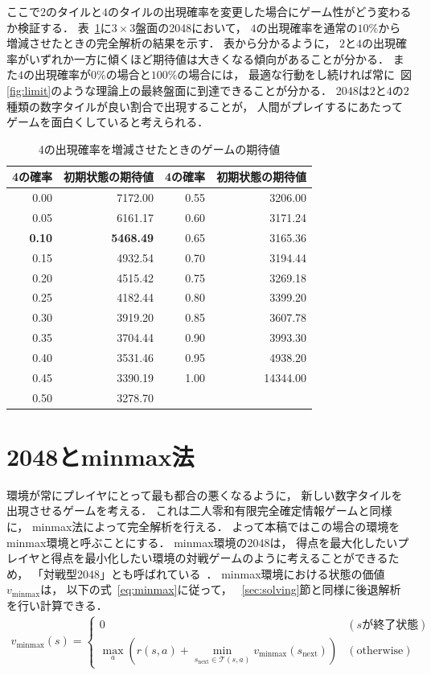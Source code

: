 ここで$2$のタイルと$4$のタイルの出現確率を変更した場合にゲーム性がどう変わるか検証する．
表~\ref{table: value_table}に$3 \times 3$盤面の2048において， $4$の出現確率を通常の$10\%$から増減させたときの完全解析の結果を示す．
表から分かるように， $2$と$4$の出現確率がいずれか一方に傾くほど期待値は大きくなる傾向があることが分かる．
また$4$の出現確率が$0\%$の場合と$100\%$の場合には， 最適な行動をし続ければ常に~図\ref{fig:limit}のような理論上の最終盤面に到達できることが分かる．
2048は$2$と$4$の$2$種類の数字タイルが良い割合で出現することが， 人間がプレイするにあたってゲームを面白くしていると考えられる．
\begin{table}[t]
\caption{4の出現確率を増減させたときのゲームの期待値}
\label{table: value_table}
\centering
\begin{tabular}{r|r||r|r}
    \hline \hline
    4の確率 & 初期状態の期待値 & 4の確率 & 初期状態の期待値 \\ \hline 
    0.00 & 7172.00 & 0.55 & 3206.00 \\
    0.05 & 6161.17 & 0.60 & 3171.24 \\
    \textbf{0.10} & \textbf{5468.49} & 0.65 & 3165.36 \\
    0.15 & 4932.54 & 0.70 & 3194.44 \\
    0.20 & 4515.42 & 0.75 & 3269.18 \\
    0.25 & 4182.44 & 0.80 & 3399.20 \\
    0.30 & 3919.20 & 0.85 & 3607.78 \\
    0.35 & 3704.44 & 0.90 & 3993.30 \\
    0.40 & 3531.46 & 0.95 & 4938.20 \\
    0.45 & 3390.19 & 1.00 & 14344.00 \\
    0.50 & 3278.70 &  & \\
    \hline
\end{tabular}
\end{table}

\section{2048とminmax法}
環境が常にプレイヤにとって最も都合の悪くなるように， 新しい数字タイルを出現させるゲームを考える．
これは二人零和有限完全確定情報ゲームと同様に， minmax法によって完全解析を行える．
よって本稿ではこの場合の環境をminmax環境と呼ぶことにする．
minmax環境の2048は， 得点を最大化したいプレイヤと得点を最小化したい環境の対戦ゲームのように考えることができるため， 「対戦型2048」とも呼ばれている~\cite{battle_2048}．
minmax環境における状態の価値$v_{\text{minmax}}$は， 以下の式~\ref{eq:minmax}に従って， ~\ref{sec:solving}節と同様に後退解析を行い計算できる．
\begin{align}
    v_{\text{minmax}}(s) =
    \begin{cases}
        0 & (s \text{が終了状態}) \\
        \max_a \left(r(s,a) + \min_{s_\text{next} \in \mathcal{T}(s,a)} v_{\text{minmax}}(s_\text{next}) \right) & (\text{otherwise})
    \end{cases}
    \label{eq:minmax}
\end{align}

